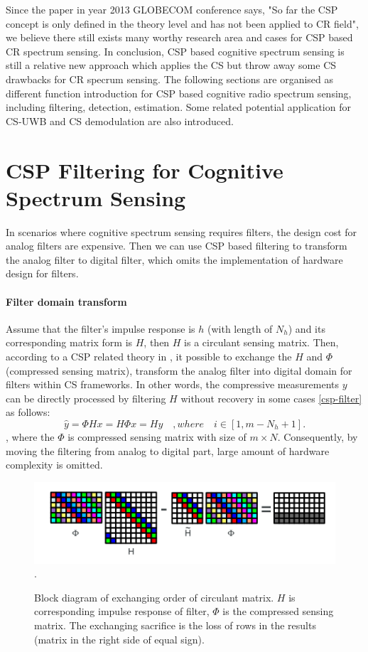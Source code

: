 Since the paper \cite{guo2013feature} in year 2013 GLOBECOM conference says, "So far the CSP concept is only defined in the theory level and has not been applied to CR field", we believe there still exists many worthy research area and cases for CSP based CR spectrum sensing. In conclusion, CSP based cognitive spectrum sensing is still a relative new approach which applies the CS but throw away some CS drawbacks for CR specrum sensing. The following sections are organised as different function introduction for CSP based cognitive radio spectrum sensing, including filtering, detection, estimation. Some related potential application for CS-UWB and CS demodulation are also introduced.

\section{CSP Filtering for Cognitive Spectrum Sensing}\label{sct:csp_filter}
\indent \indent In scenarios where cognitive spectrum sensing requires filters, the design cost for analog filters are expensive. Then we can use CSP based filtering to transform the analog filter to digital filter, which omits the implementation of hardware design for filters.

\paragraph{Filter domain transform}
Assume that the filter's impulse response is $h$ (with length of $N_h$) and its corresponding matrix form is $H$, then $H$ is a circulant sensing matrix. Then, according to a CSP related theory in \cite{valsesia2014compressive}, it possible to exchange the $H$ and $\Phi$ (compressed sensing matrix), transform the analog filter into digital domain for filters within CS frameworks. In other words, the compressive measurements $y$ can be directly processed by filtering $H$ without recovery in some cases \ref{csp-filter} as follows:  
\begin{equation}
\label{csp-filter}
\hat y = \Phi H x = H \Phi x = H y \quad, where \quad i \in [1,m-N_h+1].
\end{equation}
, where the $\Phi$ is compressed sensing matrix with size of $m \times N$.  Consequently, by moving the filtering from analog to digital part, large amount of hardware complexity is omitted. 

\begin{figure}[!t]
\centering
\includegraphics[width=5.0in]{figs/csp-filter-thm.png}
\DeclareGraphicsExtensions.
\caption{Block diagram of exchanging order of circulant matrix. $H$ is corresponding impulse response of filter, $\Phi$ is the compressed sensing matrix. The exchanging sacrifice is the loss of rows in the results (matrix in the right side of equal sign).}\label{csp-filter-thm}
\end{figure}

